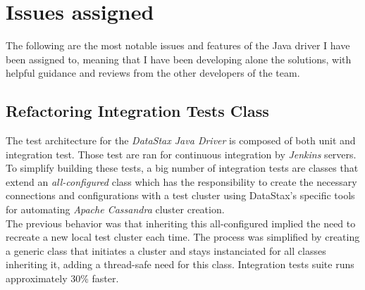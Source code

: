 \documentclass[a4paper]{report}
\newcommand{\djd}{\emph{DataStax Java Driver\xspace}}
\newcommand{\ca}{\emph{Apache Cassandra\xspace}}
\begin{document}
\newpage
\section{Issues assigned}

The following are the most notable issues and features of the Java driver I have been assigned to, meaning that I have been developing alone the solutions, with helpful guidance and reviews from the other developers of the team.

\subsection{Refactoring Integration Tests Class}
The test architecture for the \djd{} is composed of both unit and integration test. Those test are ran  for continuous integration by \emph{Jenkins} servers. To simplify building these tests, a big number of integration tests are classes that extend an \emph{all-configured} class which has the responsibility to create the necessary connections and configurations with a test cluster using DataStax's specific tools for automating \ca{} cluster creation.\\
The previous behavior was that inheriting this all-configured implied the need to recreate a new local test cluster each time. The process was simplified by creating a generic class that initiates a cluster and stays instanciated for all classes inheriting it, adding a thread-safe need for this class. Integration tests suite runs approximately 30\% faster.
\end{document}
